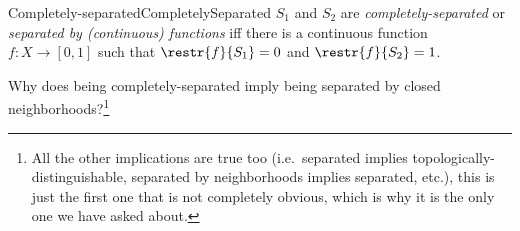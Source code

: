 \begin{dfn}{Completely-separated}{CompletelySeparated}
$S_1$ and $S_2$ are \emph{complete\-ly-separated} or \emph{separated by (continuous) functions} iff there is a continuous function $f\colon X\rightarrow [0,1]$ such that $\restr{f}{S_1}=0$ and $\restr{f}{S_2}=1$.
\begin{rmk}
Why does being completely-separated imply being separated by closed neighborhoods?\footnote{All the other implications are true too (i.e.~separated implies topologically-distinguishable, separated by neighborhoods implies separated, etc.), this is just the first one that is not completely obvious, which is why it is the only one we have asked about.}
\end{rmk}
\end{dfn}
